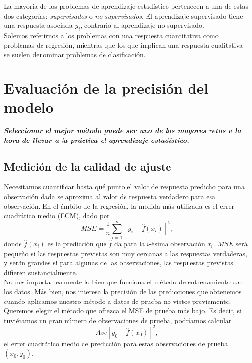 La mayoría de los problemas de aprendizaje estadístico pertenecen a una de estas dos categorías: \textit{supervisados} o \textit{no supervisados}. El aprendizaje supervisado tiene una respuesta asociada $y_i$, contrario al aprendizaje no supervisado. \\

Solemos referirnos a los problemas con una respuesta cuantitativa como problemas de regresión, mientras que los que implican una respuesta cualitativa se suelen denominar problemas de clasificación.\\

\setcounter{section}{1}
\section{Evaluación de la precisión del modelo}
\textbf{\textit{Seleccionar el mejor método puede ser uno de los mayores retos a la hora de llevar a la práctica el aprendizaje estadístico.}}\\

\subsection{Medición de la calidad de ajuste}
Necesitamos cuantificar hasta qué punto el valor de respuesta predicho para una observación dada se aproxima al valor de respuesta verdadero para esa observación. En el ámbito de la regresión, la medida más utilizada es el error cuadrático medio (ECM), dado por
$$MSE=\dfrac{1}{n}\sum_{i=1}^n \left[y_i-\hat{f}\left(x_i\right)\right]^2,$$
donde $\hat{f}\left(x_i\right)$ es la predicción que $\hat{f}$ da para la $i$-ésima observación $x_i$. $MSE$ será pequeño si las respuestas previstas son muy cercanas a las respuestas verdaderas, y serán grandes si para algunas de las observaciones, las respuestas previstas difieren sustancialmente.\\
No nos importa realmente lo bien que funciona el método de entrenamiento con los datos. Más bien, nos interesa la precisión de las predicciones que obtenemos cuando aplicamos nuestro método a datos de prueba no vistos previamente.\\

Queremos elegir el método que ofrezca el MSE de prueba más bajo. Es decir, si tuviéramos un gran número de observaciones de prueba, podríamos calcular
$$Ave\left[y_0-\hat{f}\left(x_0\right)\right]^2,$$
el error cuadrático medio de predicción para estas observaciones de prueba $(x_0,y_0)$. \\

